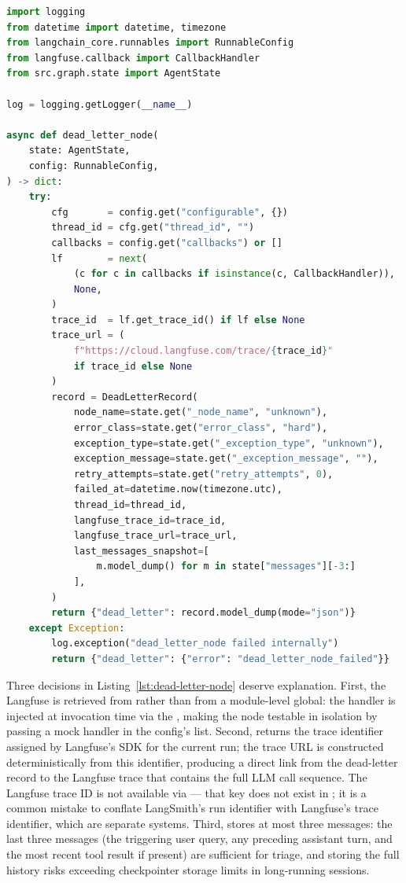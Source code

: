 \begin{lstlisting}[language=Python,
  caption={dead\_letter\_node: exception-safe state snapshot with Langfuse
    trace link --- \texttt{src/resilience/dead\_letter.py} (continued)},
  label={lst:dead-letter-node}]
import logging
from datetime import datetime, timezone
from langchain_core.runnables import RunnableConfig
from langfuse.callback import CallbackHandler
from src.graph.state import AgentState

log = logging.getLogger(__name__)

async def dead_letter_node(
    state: AgentState,
    config: RunnableConfig,
) -> dict:
    try:
        cfg       = config.get("configurable", {})
        thread_id = cfg.get("thread_id", "")
        callbacks = config.get("callbacks") or []
        lf        = next(
            (c for c in callbacks if isinstance(c, CallbackHandler)),
            None,
        )
        trace_id  = lf.get_trace_id() if lf else None
        trace_url = (
            f"https://cloud.langfuse.com/trace/{trace_id}"
            if trace_id else None
        )
        record = DeadLetterRecord(
            node_name=state.get("_node_name", "unknown"),
            error_class=state.get("error_class", "hard"),
            exception_type=state.get("_exception_type", "unknown"),
            exception_message=state.get("_exception_message", ""),
            retry_attempts=state.get("retry_attempts", 0),
            failed_at=datetime.now(timezone.utc),
            thread_id=thread_id,
            langfuse_trace_id=trace_id,
            langfuse_trace_url=trace_url,
            last_messages_snapshot=[
                m.model_dump() for m in state["messages"][-3:]
            ],
        )
        return {"dead_letter": record.model_dump(mode="json")}
    except Exception:
        log.exception("dead_letter_node failed internally")
        return {"dead_letter": {"error": "dead_letter_node_failed"}}
\end{lstlisting}

Three decisions in Listing~\ref{lst:dead-letter-node} deserve explanation.
First, the Langfuse  is retrieved from
 rather than from a module-level global: the
handler is injected at invocation time via the ,
making the node testable in isolation by passing a mock handler in the
config's  list. Second,  returns
the trace identifier assigned by Langfuse's SDK for the current run; the
trace URL is constructed deterministically from this identifier, producing a
direct link from the dead-letter record to the Langfuse trace that contains
the full LLM call sequence. The Langfuse trace ID is not available via
 --- that key does not exist in
; it is a common mistake to conflate LangSmith's
run identifier with Langfuse's trace identifier, which are separate systems.
Third,  stores at most three messages: the
last three messages (the triggering user query, any preceding assistant turn,
and the most recent tool result if present) are sufficient for triage, and
storing the full history risks exceeding checkpointer storage limits in
long-running sessions.


